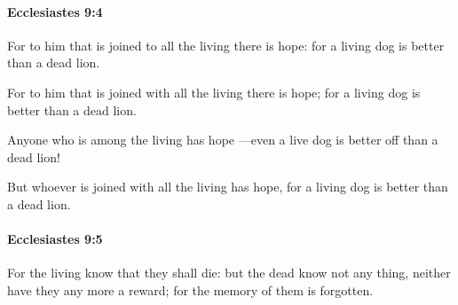 		\paragraph{Ecclesiastes 9:4} %
			\label{ECCLESIASTES-9-4}

			For to him that is joined to all the living there is hope: for a living dog is better than a dead lion.

			\begin{versebox}
					\item[BHS] 
					\item[LXX] 
					\item[ASV] For to him that is joined with all the living there is hope; for a living dog is better than a dead lion.
					\item[NIV] Anyone who is among the living has hope —even a live dog is better off than a dead lion!
					\item[NRSV] But whoever is joined with all the living has hope, for a living dog is better than a dead lion.
			\end{versebox}

		\paragraph{Ecclesiastes 9:5} %
			\label{ECCLESIASTES-9-5}

			For the living know that they shall die: but the dead know not any thing, neither have they any more a reward; for the memory of them is forgotten.

